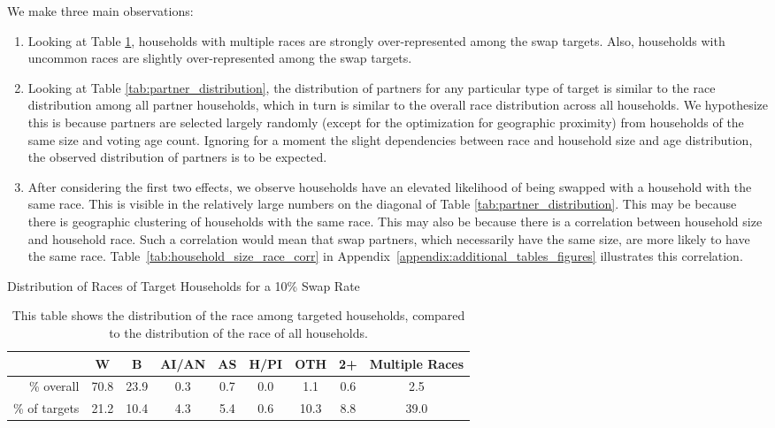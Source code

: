 We make three main observations:
\begin{enumerate}
    \item Looking at Table \ref{tab:target_distribution}, households with multiple races are strongly over-represented among the swap targets. Also, households with uncommon races are slightly over-represented among the swap targets.
    \item Looking at Table \ref{tab:partner_distribution}, the distribution of partners for any particular type of target is similar to the race distribution among all partner households, which in turn is similar to the overall race distribution across all households. We hypothesize this is because partners are selected largely randomly (except for the optimization for geographic proximity) from households of the same size and voting age count. Ignoring for a moment the slight dependencies between race and household size and age distribution, the observed distribution of partners is to be expected.
    \item After considering the first two effects, we observe households have an elevated likelihood of being swapped with a household with the same race. This is visible in the relatively large numbers on the diagonal of Table \ref{tab:partner_distribution}. This may be because there is geographic clustering of households with the same race. This may also be because there is a correlation between household size and household race. Such a correlation would mean that swap partners, which necessarily have the same size, are more likely to have the same race. Table~\ref{tab:household_size_race_corr} in Appendix~\ref{appendix:additional_tables_figures} illustrates this correlation.
\end{enumerate}

\begin{table}
    \centering
    Distribution of Races of Target Households for a 10\% Swap Rate
    \begin{tabular}{|r|c|c|c|c|c|c|c|c|}
    \hline
                  & W    & B    & AI/AN & AS  & H/PI & OTH  & 2+  & Multiple Races \\ \hline
    \% overall    & 70.8 & 23.9 & 0.3   & 0.7 & 0.0  & 1.1  & 0.6 & 2.5            \\ \hline
    \% of targets & 21.2 & 10.4 & 4.3   & 5.4 & 0.6  & 10.3 & 8.8 & 39.0           \\ \hline
    \end{tabular}

    \caption{This table shows the distribution of the race among targeted households, compared to the distribution of the race of all households.}
    \label{tab:target_distribution}
\end{table}

